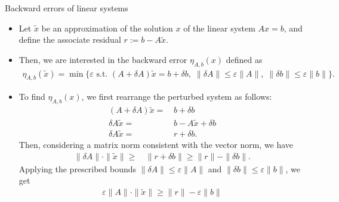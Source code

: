 \documentclass[t,usepdftitle=false]{beamer}
\begin{document}
\begin{frame}{Backward errors of linear systems}
\begin{itemize}
\item Let $\tilde{x}$ be an approximation of the solution $x$ of the linear system $Ax=b$, and define the associate residual $r:=b-A\tilde{x}$.
\item Then, we are interested in the backward error $\eta_{A,b}(x)$ defined as
\begin{align*}
\eta_{A,b}(\tilde{x})=\min
\{\varepsilon\text{ s.t. }
(A+\delta A)\tilde{x}=b+\delta b,\;
\|\delta A\|\leq\varepsilon\|A\|,\;
\|\delta b\|\leq\varepsilon\|b\|\}.
\end{align*}
\item To find $\eta_{A,b}(x)$, we first rearrange the perturbed system as follows:
\begin{align*}
(A+\delta A)\tilde{x}=&\,b+\delta b\\
\delta A\tilde{x}=&\,b-A\tilde{x}+\delta b\\
\delta A\tilde{x}=&\,r+\delta b.
\end{align*}
Then, considering a matrix norm consistent with the vector norm, we have
\begin{align*}
\|\delta A\|\cdot\|\tilde{x}\|\geq &\,\|r+\delta b\|\geq \|r\|-\|\delta b\|.
\end{align*}
Applying the prescribed bounds $\|\delta A\|\leq\varepsilon\|A\|$ and $\|\delta b\|\leq\varepsilon\|b\|$, we get 
\begin{align*}
\varepsilon\|A\|\cdot\|\tilde{x}\|\geq \|r\|-\varepsilon\|b\|
\end{align*}
\end{itemize}
\end{frame}
\end{document}
